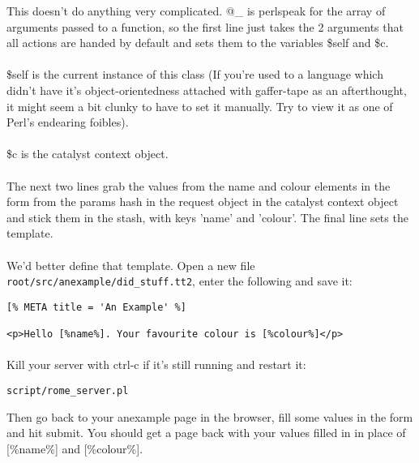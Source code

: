 This doesn't do anything very complicated. @\_ is perl\-speak for the array of arguments passed to a function, so the first line just takes the 2 arguments that all actions are handed by default and sets them to the variables \$self and \$c. 

\paragraph*{}
\$self is the current instance of this class (If you're used to a language which didn't have it's object-orientedness attached with gaffer-tape as an afterthought, it might seem a bit clunky to have to set it manually. Try to view it as one of Perl's endearing foibles). 

\paragraph*{}
\$c is the catalyst context object. 

\paragraph*{}
The next two lines grab the values from the name and colour elements in the form from the params hash in the request object in the catalyst context object and stick them in the stash, with keys 'name' and 'colour'. The final line sets the template. 

\paragraph*{}
We'd better define that template. Open a new file \verb|root/src/anexample/did_stuff.tt2|, enter the following and save it:

\begin{verbatim}
[% META title = 'An Example' %]

<p>Hello [%name%]. Your favourite colour is [%colour%]</p>
\end{verbatim}

\paragraph*{}
Kill your server with ctrl-c if it's still running and restart it:

\begin{verbatim}
script/rome_server.pl
\end{verbatim}

Then go back to your anexample page in the browser, fill some values in the form and hit submit. You should get a page back with your values filled in in place of [\%name\%] and [\%colour\%].

